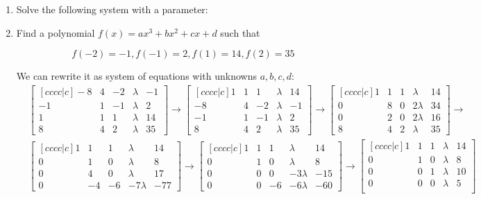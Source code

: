 \documentclass{article}
\begin{document}
\begin{enumerate}
\item Solve the following system with a parameter:

\item Find a polynomial $f(x) = ax^3 + bx^2 + cx + d$ such that

\[f(-2) = -1, f(-1) = 2, f(1) = 14, f(2) = 35\]

We can rewrite it as system of equations with unknowns $a, b, c, d$:
\begin{align*}
&\begin{bmatrix}[cccc|c]
-8 & 4 & -2 & \lambda & -1\\
-1 & 1 & -1 & \lambda & 2\\
1 & 1 & 1 & \lambda & 14\\
8 & 4 & 2 & \lambda & 35
\end{bmatrix}
\to
\begin{bmatrix}[cccc|c]
1 & 1 & 1 & \lambda & 14\\
-8 & 4 & -2 & \lambda & -1\\
-1 & 1 & -1 & \lambda & 2\\
8 & 4 & 2 & \lambda & 35
\end{bmatrix}
\to
\begin{bmatrix}[cccc|c]
1 & 1 & 1 & \lambda & 14\\
0 & 8 & 0 & 2\lambda & 34\\
0 & 2 & 0 & 2\lambda & 16\\
8 & 4 & 2 & \lambda & 35
\end{bmatrix}
\to\\
&\begin{bmatrix}[cccc|c]
1 & 1 & 1 & \lambda & 14\\
0 & 1 & 0 & \lambda & 8\\
0 & 4 & 0 & \lambda & 17\\
0 & -4 & -6 & -7\lambda & -77
\end{bmatrix}
\to
\begin{bmatrix}[cccc|c]
1 & 1 & 1 & \lambda & 14\\
0 & 1 & 0 & \lambda & 8\\
0 & 0 & 0 & -3\lambda & -15\\
0 & 0 & -6 & -6\lambda & -60
\end{bmatrix}
\to
\begin{bmatrix}[cccc|c]
1 & 1 & 1 & \lambda & 14\\
0 & 1 & 0 & \lambda & 8\\
0 & 0 & 1 & \lambda & 10\\
0 & 0 & 0 & \lambda & 5\\
\end{bmatrix}
\end{align*}


\end{enumerate}
\end{document}
